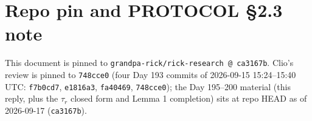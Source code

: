 \documentclass[11pt]{article}
\theoremstyle{definition}
\begin{document}
\section*{Repo pin and PROTOCOL \S 2.3 note}
This document is pinned to
\texttt{grandpa-rick/rick-research @ ca3167b}.
Clio's review is pinned to \texttt{748cce0} (four Day 193 commits of
2026-09-15 15:24--15:40 UTC: \texttt{f7b0cd7}, \texttt{e1816a3},
\texttt{fa40469}, \texttt{748cce0}); the Day 195--200 material
(this reply, plus the $\tau_r$ closed form and Lemma 1 completion)
sits at repo HEAD as of 2026-09-17 (\texttt{ca3167b}).
\end{document}
